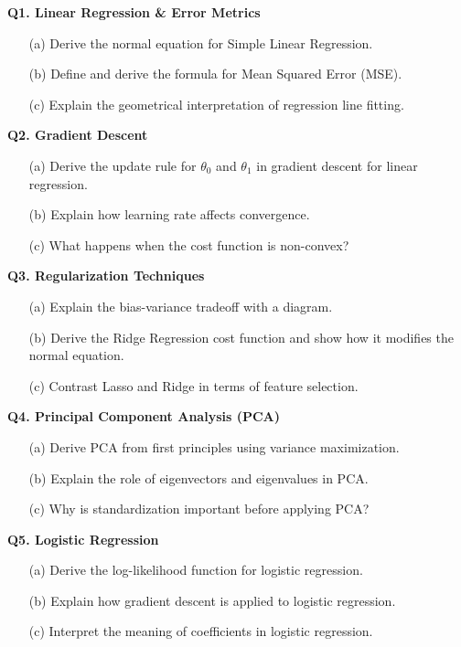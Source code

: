 \documentclass[12pt]{article}
\begin{document}
\textbf{Q1. Linear Regression \& Error Metrics}
\begin{itemize}
  \item[(a)] Derive the normal equation for Simple Linear Regression.
  \item[(b)] Define and derive the formula for Mean Squared Error (MSE).
  \item[(c)] Explain the geometrical interpretation of regression line fitting.
\end{itemize}

\textbf{Q2. Gradient Descent}
\begin{itemize}
  \item[(a)] Derive the update rule for $\theta_0$ and $\theta_1$ in gradient descent for linear regression.
  \item[(b)] Explain how learning rate affects convergence.
  \item[(c)] What happens when the cost function is non-convex?
\end{itemize}

\textbf{Q3. Regularization Techniques}
\begin{itemize}
  \item[(a)] Explain the bias-variance tradeoff with a diagram.
  \item[(b)] Derive the Ridge Regression cost function and show how it modifies the normal equation.
  \item[(c)] Contrast Lasso and Ridge in terms of feature selection.
\end{itemize}

\textbf{Q4. Principal Component Analysis (PCA)}
\begin{itemize}
  \item[(a)] Derive PCA from first principles using variance maximization.
  \item[(b)] Explain the role of eigenvectors and eigenvalues in PCA.
  \item[(c)] Why is standardization important before applying PCA?
\end{itemize}

\textbf{Q5. Logistic Regression}
\begin{itemize}
  \item[(a)] Derive the log-likelihood function for logistic regression.
  \item[(b)] Explain how gradient descent is applied to logistic regression.
  \item[(c)] Interpret the meaning of coefficients in logistic regression.
\end{itemize}
\end{document}
